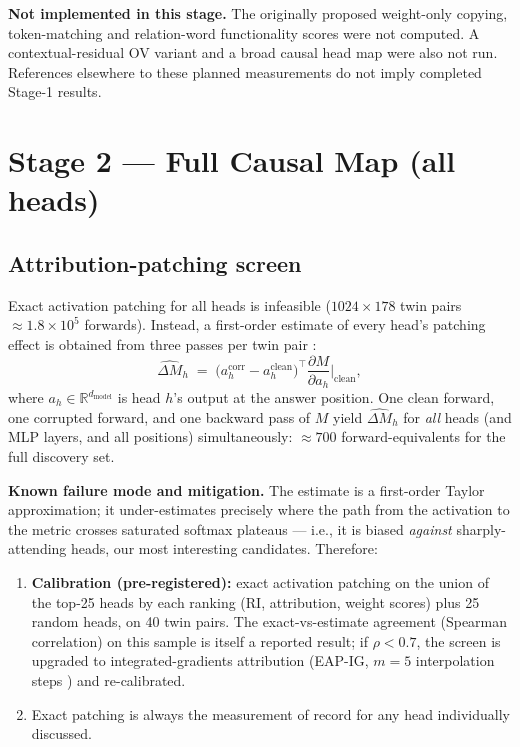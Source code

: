 \documentclass[11pt,a4paper]{article}
\begin{document}
\textbf{Not implemented in this stage.} The originally proposed weight-only copying, token-matching and relation-word functionality scores were not computed. A contextual-residual OV variant and a broad causal head map were also not run. References elsewhere to these planned measurements do not imply completed Stage-1 results.

\section{Stage 2 --- Full Causal Map (all heads)}
\subsection{Attribution-patching screen}
Exact activation patching for all heads is infeasible ($1024 \times 178$ twin pairs $\approx 1.8\times10^5$ forwards). Instead, a first-order estimate of every head's patching effect is obtained from three passes per twin pair \cite{attrpatch}:
\begin{equation}
\widehat{\Delta M}_h \;=\; \big(a_h^{\text{corr}} - a_h^{\text{clean}}\big)^{\!\top} \frac{\partial M}{\partial a_h}\bigg|_{\text{clean}},
\end{equation}
where $a_h \in \mathbb{R}^{d_{\text{model}}}$ is head $h$'s output at the answer position. One clean forward, one corrupted forward, and one backward pass of $M$ yield $\widehat{\Delta M}_h$ for \emph{all} heads (and MLP layers, and all positions) simultaneously: $\approx 700$ forward-equivalents for the full discovery set.

\textbf{Known failure mode and mitigation.} The estimate is a first-order Taylor approximation; it under-estimates precisely where the path from the activation to the metric crosses saturated softmax plateaus --- i.e., it is biased \emph{against} sharply-attending heads, our most interesting candidates. Therefore:
\begin{enumerate}[itemsep=1pt]
\item \textbf{Calibration (pre-registered):} exact activation patching on the union of the top-25 heads by each ranking (RI, attribution, weight scores) plus 25 random heads, on 40 twin pairs. The exact-vs-estimate agreement (Spearman correlation) on this sample is itself a reported result; if $\rho < 0.7$, the screen is upgraded to integrated-gradients attribution (EAP-IG, $m{=}5$ interpolation steps \cite{eapig}) and re-calibrated.
\item Exact patching is always the measurement of record for any head individually discussed.
\end{enumerate}
\end{document}
